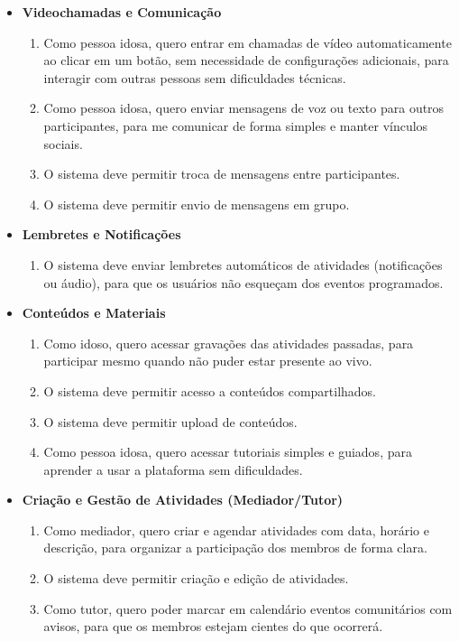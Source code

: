 \begin{itemize}
    \item \textbf{Videochamadas e Comunicação}
        \begin{enumerate}
            \item [US6] Como pessoa idosa, quero entrar em chamadas de vídeo automaticamente ao clicar em um botão, sem necessidade de configurações adicionais, para interagir com outras pessoas sem dificuldades técnicas.
            \item [US7] Como pessoa idosa, quero enviar mensagens de voz ou texto para outros participantes, para me comunicar de forma simples e manter vínculos sociais.
            \item [RF4] O sistema deve permitir troca de mensagens entre participantes.
            \item [RF5] O sistema deve permitir envio de mensagens em grupo.
        \end{enumerate}
 
    \item \textbf{Lembretes e Notificações}
        \begin{enumerate}
            \item [RF6] O sistema deve enviar lembretes automáticos de atividades (notificações ou áudio), para que os usuários não esqueçam dos eventos programados.
        \end{enumerate}
 
    \item \textbf{Conteúdos e Materiais}
        \begin{enumerate}
            \item [US8] Como idoso, quero acessar gravações das atividades passadas, para participar mesmo quando não puder estar presente ao vivo.
            \item [RF7] O sistema deve permitir acesso a conteúdos compartilhados.
            \item [RF8] O sistema deve permitir upload de conteúdos.
            \item [US9] Como pessoa idosa, quero acessar tutoriais simples e guiados, para aprender a usar a plataforma sem dificuldades.
        \end{enumerate}
 
    \item \textbf{Criação e Gestão de Atividades (Mediador/Tutor)}
        \begin{enumerate}
            \item [US10] Como mediador, quero criar e agendar atividades com data, horário e descrição, para organizar a participação dos membros de forma clara.
            \item [RF9] O sistema deve permitir criação e edição de atividades.
            \item [US11] Como tutor, quero poder marcar em calendário eventos comunitários com avisos, para que os membros estejam cientes do que ocorrerá.
        \end{enumerate}
 

\end{itemize}
